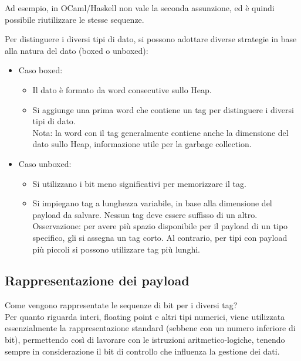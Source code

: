 \documentclass{article}
\begin{document}
Ad esempio, in OCaml/Haskell non vale la seconda assunzione, ed è quindi possibile riutilizzare le stesse sequenze.

Per distinguere i diversi tipi di dato, si possono adottare diverse strategie in base alla natura del dato (boxed o unboxed):
\begin{itemize}
    \item Caso boxed:
    \begin{itemize}
        \item Il dato è formato da word consecutive sullo Heap.
        \item Si aggiunge una prima word che contiene un tag per distinguere i diversi tipi di dato.\vspace{10pt}\\
        Nota: la word con il tag generalmente contiene anche la dimensione del dato sullo Heap, informazione utile per la garbage collection.
    \end{itemize}
    \item Caso unboxed:
    \begin{itemize}
        \item Si utilizzano i bit meno significativi per memorizzare il tag.
        \item Si impiegano tag a lunghezza variabile, in base alla dimensione del payload da salvare. Nessun tag deve essere suffisso di un altro.\vspace{10pt}\\
        Osservazione: per avere più spazio disponibile per il payload di un tipo specifico, gli si assegna un tag corto. Al contrario, per tipi con payload più piccoli si possono utilizzare tag più lunghi.\\
    \end{itemize}
\end{itemize}

\subsection*{Rappresentazione dei payload}
Come vengono rappresentate le sequenze di bit per i diversi tag?\\
Per quanto riguarda interi, floating point e altri tipi numerici, viene utilizzata essenzialmente la rappresentazione standard (sebbene con un numero inferiore di bit), permettendo così di lavorare con le istruzioni aritmetico-logiche, tenendo sempre in considerazione il bit di controllo che influenza la gestione dei dati.
\end{document}
